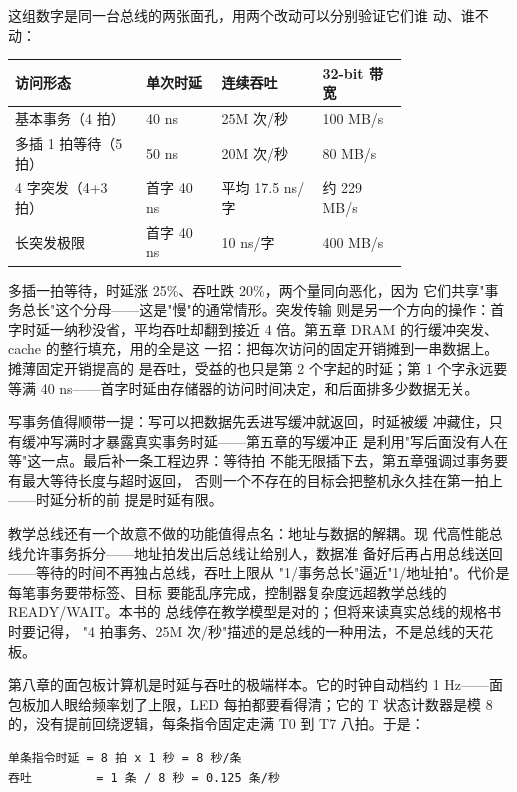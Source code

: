 这组数字是同一台总线的两张面孔，用两个改动可以分别验证它们谁
动、谁不动：

\begin{longtable}{L{0.26\linewidth}L{0.15\linewidth}L{0.2\linewidth}L{0.17\linewidth}}
\toprule
访问形态 & 单次时延 & 连续吞吐 & 32-bit 带宽 \\
\midrule
基本事务（4 拍） & 40 ns & 25M 次/秒 & 100 MB/s \\
多插 1 拍等待（5 拍） & 50 ns & 20M 次/秒 & 80 MB/s \\
4 字突发（4+3 拍） & 首字 40 ns & 平均 17.5 ns/字 & 约 229 MB/s \\
长突发极限 & 首字 40 ns & 10 ns/字 & 400 MB/s \\
\bottomrule
\end{longtable}

多插一拍等待，时延涨 25\%、吞吐跌 20\%，两个量同向恶化，因为
它们共享"事务总长"这个分母——这是"慢"的通常情形。突发传输
则是另一个方向的操作：首字时延一纳秒没省，平均吞吐却翻到接近
4 倍。第五章 DRAM 的行缓冲突发、cache 的整行填充，用的全是这
一招：把每次访问的固定开销摊到一串数据上。摊薄固定开销提高的
是吞吐，受益的也只是第 2 个字起的时延；第 1 个字永远要等满 40
ns——首字时延由存储器的访问时间决定，和后面排多少数据无关。

写事务值得顺带一提：写可以把数据先丢进写缓冲就返回，时延被缓
冲藏住，只有缓冲写满时才暴露真实事务时延——第五章的写缓冲正
是利用"写后面没有人在等"这一点。最后补一条工程边界：等待拍
不能无限插下去，第五章强调过事务要有最大等待长度与超时返回，
否则一个不存在的目标会把整机永久挂在第一拍上——时延分析的前
提是时延有限。

教学总线还有一个故意不做的功能值得点名：地址与数据的解耦。现
代高性能总线允许事务拆分——地址拍发出后总线让给别人，数据准
备好后再占用总线送回——等待的时间不再独占总线，吞吐上限从
"1/事务总长"逼近"1/地址拍"。代价是每笔事务要带标签、目标
要能乱序完成，控制器复杂度远超教学总线的 READY/WAIT。本书的
总线停在教学模型是对的；但将来读真实总线的规格书时要记得，
"4 拍事务、25M 次/秒"描述的是总线的一种用法，不是总线的天花
板。

第八章的面包板计算机是时延与吞吐的极端样本。它的时钟自动档约
1 Hz——面包板加人眼给频率划了上限，LED 每拍都要看得清；它的
T 状态计数器是模 8 的，没有提前回绕逻辑，每条指令固定走满 T0
到 T7 八拍。于是：

\begin{lstlisting}
单条指令时延 = 8 拍 x 1 秒 = 8 秒/条
吞吐         = 1 条 / 8 秒 = 0.125 条/秒
\end{lstlisting}


